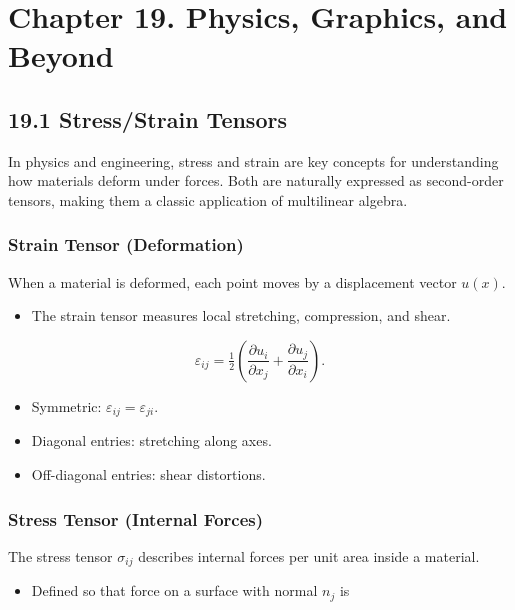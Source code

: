 \documentclass[
  letterpaper,
  DIV=11,
  numbers=noendperiod]{scrreprt}
\providecommand{\tightlist}{%
  \setlength{\itemsep}{0pt}\setlength{\parskip}{0pt}}
\begin{document}
\section{Chapter 19. Physics, Graphics, and
Beyond}\label{chapter-19.-physics-graphics-and-beyond}

\subsection{19.1 Stress/Strain Tensors}\label{stressstrain-tensors}

In physics and engineering, stress and strain are key concepts for
understanding how materials deform under forces. Both are naturally
expressed as second-order tensors, making them a classic application of
multilinear algebra.

\subsubsection{Strain Tensor
(Deformation)}\label{strain-tensor-deformation}

When a material is deformed, each point moves by a displacement vector
\(u(x)\).

\begin{itemize}
\tightlist
\item
  The strain tensor measures local stretching, compression, and shear.
\end{itemize}

\[
\varepsilon_{ij} = \tfrac{1}{2} \left( \frac{\partial u_i}{\partial x_j} + \frac{\partial u_j}{\partial x_i} \right).
\]

\begin{itemize}
\tightlist
\item
  Symmetric: \(\varepsilon_{ij} = \varepsilon_{ji}\).
\item
  Diagonal entries: stretching along axes.
\item
  Off-diagonal entries: shear distortions.
\end{itemize}

\subsubsection{Stress Tensor (Internal
Forces)}\label{stress-tensor-internal-forces}

The stress tensor \(\sigma_{ij}\) describes internal forces per unit
area inside a material.

\begin{itemize}
\tightlist
\item
  Defined so that force on a surface with normal \(n_j\) is
\end{itemize}
\end{document}
